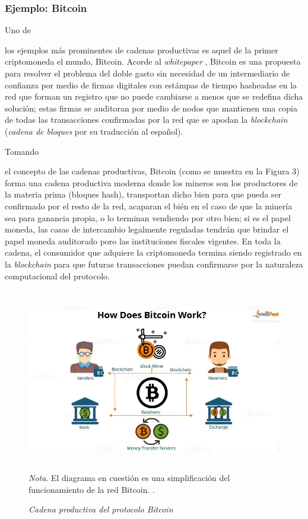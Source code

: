 \documentclass[stu, 12pt, letterpaper, donotrepeattitle, floatsintext, natbib]{apa7}
\begin{document}
\subsubsection{Ejemplo: Bitcoin}
Uno de \begin{justifying}
    los ejemplos más prominentes de cadenas productivas es aquel de la primer criptomoneda el mundo, Bitcoin. 
    Acorde al \emph{whitepaper} \citep{article}, %
        Bitcoin es una propuesta para resolver el problema del doble gasto sin necesidad de un intermediario de confianza por medio
        de firmas digitales con estámpas de tiempo hasheadas en la red que forman un registro que no puede cambiarse a menos que se redefina
        dicha solución; estas firmas se auditoran por medio de nodos que mantienen una copia de todas las transacciones confirmadas por la red que se apodan
        la \emph{blockchain} (\emph{cadena de bloques} por su traducción al español).\par
\end{justifying}
Tomando \begin{justifying}
     el concepto de las cadenas productivas, Bitcoin 
    (como se muestra en la Figura 3) forma una cadena productiva moderna donde los mineros son los productores de la materia prima (bloques hash), transportan dicho
    bien para que pueda ser confirmado por el resto de la red, acaparan el bién en el caso de que la minería sea para ganancia propia, o lo terminan
    vendiendo por otro bien; si es el papel moneda, las casas de intercambio legalmente reguladas tendrán que brindar el papel moneda auditorado poro las instituciones fiscales vigentes. 
    En toda la cadena, el consumidor que adquiere la criptomoneda termina siendo registrado en la \emph{blockchain}
    para que futuras transacciones puedan confirmarse por la naturaleza computacional del protocolo.\par
\end{justifying}
\begin{figure}[H]
    \caption{\emph{Cadena productiva del protocolo Bitcoin\\}}
    \centering
    \smallskip
    \includegraphics[width=14cm,height=8cm]{bitcoin.jpg}
    \bigskip
    \\\small\textit{Nota}. El diagrama en cuestión es una simplificación del funcionamiento de la red Bitcoin. \citep{intellipaat-2019}. %
\end{figure}
\vspace{\baselineskip}
\end{document}
